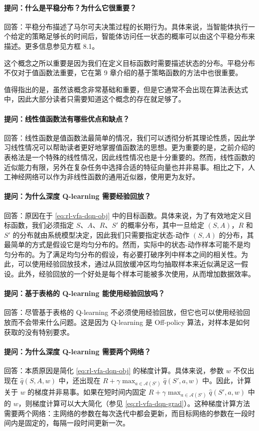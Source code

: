 \paragraph{提问：什么是平稳分布？为什么它很重要？}回答：平稳分布描述了马尔可夫决策过程的长期行为。具体来说，当智能体执行一个给定的策略足够长的时间后，智能体访问任一状态的概率可以由这个平稳分布来描述。更多信息参见方框 8.1。

这个概念之所以重要是因为我们在定义目标函数时需要描述状态的分布。平稳分布不仅对于值函数法重要，它在第 9 章介绍的基于策略函数的方法中也很重要。

值得指出的是，虽然该概念非常基础和重要，但是它通常不会出现在算法表达式中，因此大部分读者只需要知道这个概念的存在就足够了。

\paragraph{提问：线性值函数法有哪些优点和缺点？}回答：线性函数是值函数法最简单的情况，我们可以透彻分析其理论性质，因此学习线性情况可以帮助读者更好地掌握值函数法的思想。更为重要的是，之前介绍的表格法是一个特殊的线性情况，因此线性情况也是十分重要的。然而，线性函数的近似能力有限，另外在复杂任务中选择合适的特征向量也并非易事。相比之下，人工神经网络可以作为非线性函数的通用近似器，使用更为友好。

\paragraph{提问：为什么深度 Q-learning 需要经验回放？}回答：原因在于 \cref{eq:rl-vfa-dqn-obj} 中的目标函数。具体来说，为了有效地定义目标函数，我们必须指定 $S$、$A$、$R$、$S'$ 的概率分布，其中一旦给定 $(S,A)$，$R$ 和 $S'$ 的分布就由系统模型决定，因此我们只需要指定状态-动作 $(S,A)$ 的分布，其最简单的方式是假设它是均匀分布的。然而，实际中的状态-动作样本可能不是均匀分布的。为了满足均匀分布的假设，有必要打破序列中样本之间的相关性。为此，可以使用经验回放技术，通过从回放缓冲区均匀抽取样本来近似满足这一假设。此外，经验回放的一个好处是每个样本可能被多次使用，从而增加数据效率。

\paragraph{提问：基于表格的 Q-learning 能使用经验回放吗？}回答：尽管基于表格的 Q-learning 不必须使用经验回放，但它也可以使用经验回放而不会带来什么问题。这是因为 Q-learning 是 Off-policy 算法，对样本是如何获取的没有特别要求。

\paragraph{提问：为什么深度 Q-learning 需要两个网络？}回答：本质原因是简化 \cref{eq:rl-vfa-dqn-obj} 的梯度计算。具体来说，参数 $w$ 不仅出现在 $\hat{q}(S, A, w)$ 中，还出现在 $R + \gamma \max_{a \in \mathcal{A}(S')} \hat{q}(S', a, w)$ 中。因此，计算关于 $w$ 的梯度并非易事。如果在短时间内固定 $R + \gamma \max_{a \in \mathcal{A}(S')} \hat{q}(S', a, w)$ 中的 $w$，则梯度计算可以大大简化（参见 \cref{eq:rl-vfa-dqn-grad}）。这种梯度计算方法需要两个网络：主网络的参数在每次迭代中都会更新，而目标网络的参数在一段时间内是固定的，每隔一段时间更新一次。

